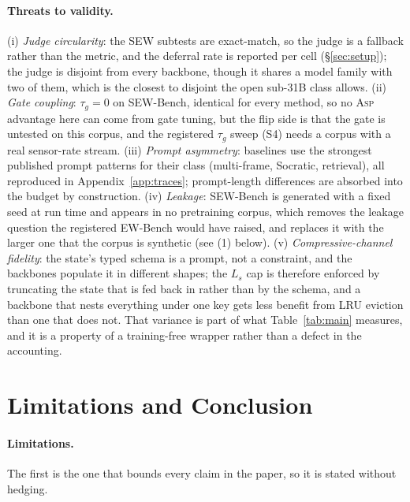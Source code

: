 \documentclass[10pt]{article}
\theoremstyle{definition}
\theoremstyle{plain}
\newcommand{\ASP}{\textsc{Asp}}
\begin{document}
\paragraph{Threats to validity.} (i) \emph{Judge circularity}: the SEW subtests are exact-match, so the judge is a fallback rather than the metric, and the deferral rate is reported per cell (\S\ref{sec:setup}); the judge is disjoint from every backbone, though it shares a model family with two of them, which is the closest to disjoint the open sub-31B class allows. (ii) \emph{Gate coupling}: $\tau_g{=}0$ on SEW-Bench, identical for every method, so no \ASP{} advantage here can come from gate tuning, but the flip side is that the gate is untested on this corpus, and the registered $\tau_g$ sweep (S4) needs a corpus with a real sensor-rate stream. (iii) \emph{Prompt asymmetry}: baselines use the strongest published prompt patterns for their class (multi-frame, Socratic, retrieval), all reproduced in Appendix~\ref{app:traces}; prompt-length differences are absorbed into the budget by construction. (iv) \emph{Leakage}: SEW-Bench is generated with a fixed seed at run time and appears in no pretraining corpus, which removes the leakage question the registered EW-Bench would have raised, and replaces it with the larger one that the corpus is synthetic (see (1) below). (v) \emph{Compressive-channel fidelity}: the state's typed schema is a prompt, not a constraint, and the backbones populate it in different shapes; the $L_s$ cap is therefore enforced by truncating the state that is fed back in rather than by the schema, and a backbone that nests everything under one key gets less benefit from LRU eviction than one that does not. That variance is part of what Table~\ref{tab:main} measures, and it is a property of a training-free wrapper rather than a defect in the accounting.


\section{Limitations and Conclusion}
\label{sec:limits}

\paragraph{Limitations.} The first is the one that bounds every claim in the paper, so it is stated without hedging.
\end{document}
